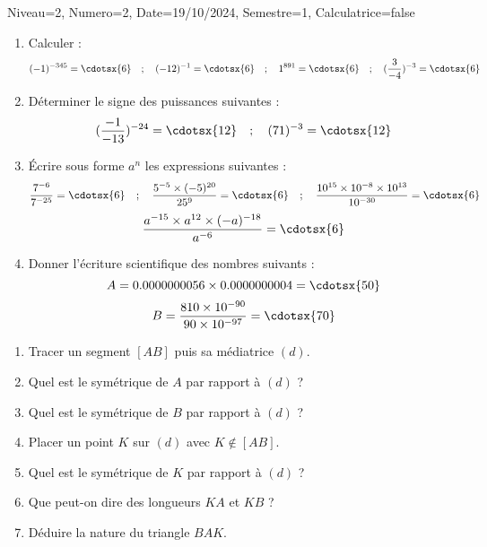 \documentclass[a4paper,12pt]{article}
\begin{document}
\begin{Maquette}[DS]{Niveau=2, Numero=2, Date=19/10/2024, Semestre=1, Calculatrice=false}

\begin{exercice}
\begin{enumerate}
\item{} Calculer : 
\[
 (-1)^{-345}=\cdotsx{6} \quad; \quad (-12)^{-1}=\cdotsx{6} \quad; \quad 1^{891}=\cdotsx{6} \quad; \quad (\dfrac{3}{-4})^{-3}=\cdotsx{6}
\]
\item{} Déterminer le signe des puissances suivantes :
\[ (\dfrac{-1}{-13})^{-24}=\cdotsx{12} \quad; \quad 
	(71)^{-3}=\cdotsx{12}
\] 
\item{} Écrire sous forme $a^{n}$ les expressions suivantes :
\[\dfrac{7^{-6}}{7^{-25}}=\cdotsx{6}\quad; \quad
	\dfrac{5^{-5}\times (-5)^{20}}{25^{9}}=\cdotsx{6}\quad; \quad
	\dfrac{10^{15}\times 10^{-8}\times 10^{13}}{10^{-30}}=\cdotsx{6}
\]
\[
\dfrac{a^{-15}\times a^{12}\times (-a)^{-18}}{a^{-6}}=\cdotsx{6}
\]
\item{} Donner l'écriture scientifique des nombres suivants :
\[
	A=0.0000000056\times 0.0000000004=\cdotsx{50} 
\]
\[	
	B=\dfrac{810\times 10^{-90}}{90\times 10^{-97}}=\cdotsx{70}
\]
\end{enumerate}
\end{exercice}

\begin{exercice}
\begin{enumerate}
\item{} Tracer un segment $[AB]$ puis sa médiatrice $(d)$.
\item{} Quel est le symétrique de $A$ par rapport à $(d)$ ?
\item{} Quel est le symétrique de $B$ par rapport à $(d)$ ?
\item{} Placer un point $K$ sur $(d)$ avec $K\notin [AB]$.
\item{} Quel est le symétrique de $K$ par rapport à $(d)$ ?
\item{} Que peut-on dire des longueurs $KA$ et $KB$ ?
\item{} Déduire la nature du triangle $BAK$.
\end{enumerate}
\end{exercice}
\end{Maquette}

\end{document}
